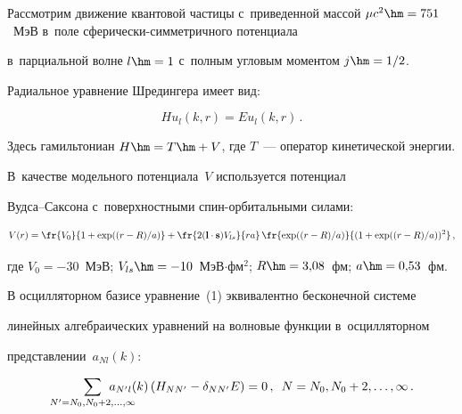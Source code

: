   Рассмотрим движение квантовой частицы с~приведенной массой $\mu 


c^2\hm= 751$~МэВ в~поле сфе\-ри\-чески-сим\-мет\-рич\-но\-го потенциала 


в~парциальной волне $l\hm=1$ с~пол\-ным угловым моментом $j\hm=1/2$. 


Радиальное урав\-не\-ние Шредингера имеет вид:


  \begin{equation}


  H u_l(k,r)=E u_l(k,r)\,.


  \label{e1-b}


  \end{equation}


Здесь гамильтониан $H\hm= T\hm+ V$, где $T$~--- оператор кинетической энергии. 


В~качестве модельного потенциала~$V$ используется потенциал  


Вуд\-са--Сак\-со\-на с~поверхностными спин-ор\-би\-таль\-ны\-ми силами:


\begin{equation*}


V(r)=  \fr{V_0}{1+\exp ((r-R)/a)} + \fr{2(\mathbf{l}\cdot 


\mathbf{s})V_{ls}}{ra}\,\fr{\exp ((r-R)/a)}{(1+\exp ((r-R)/a))^2}\,,




\end{equation*}


где $V_0=-30$~МэВ; $V_{ls}\hm= -10$~МэВ$\cdot$фм$^2$; $R\hm= 


3{,}08$~фм; $a\hm= 0{,}53$~фм.


  


  В осцилляторном базисе уравнение~(1) эквивалентно бесконечной сис\-те\-ме 


линейных ал\-геб\-ра\-и\-че\-ских уравнений на волновые функ\-ции в~осцилляторном 


пред\-став\-ле\-нии~$a_{Nl}(k)$:


  \begin{equation}


  \sum\limits_{N^\prime =N_0, N_0+2, \ldots , \infty} \hspace*{-8mm}a_{N^\prime l}(k) \left( 


H_{NN^\prime}-\delta_{NN^\prime}E\right) =0\,,\enskip N=N_0, N_0+2, \ldots , 


\infty\,.


  \label{e3-b}


  \end{equation}


